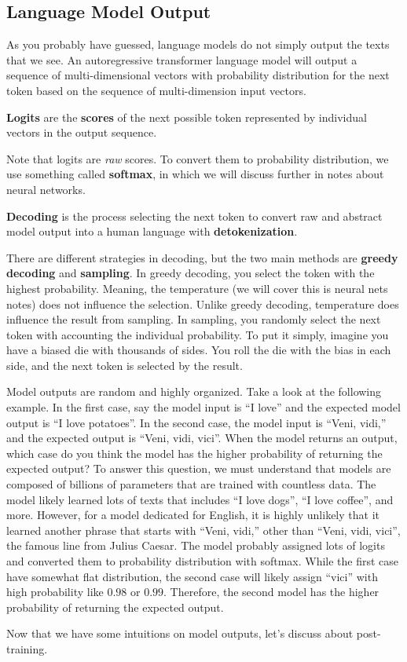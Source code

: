 \documentclass[../../main.tex]{subfiles}
\begin{document}
\subsection{Language Model Output}

As you probably have guessed, language models do not simply
output the texts that we see. An autoregressive transformer
language model will output a sequence of multi-dimensional
vectors with probability distribution for the next token based
on the sequence of multi-dimension input vectors.

\begin{definition}{}{}
\textbf{Logits} are the \textbf{scores} of the next possible
token represented by individual vectors in the output sequence.
\end{definition}

Note that logits are \textit{raw} scores. To convert them to
probability distribution, we use something called
\textbf{softmax}, in which we will discuss further in notes
about neural networks.

\begin{definition}{}{}
\textbf{Decoding} is the process selecting the next token to
convert raw and abstract model output into a human language
with \textbf{detokenization}.
\end{definition}

There are different strategies in decoding, but the two main
methods are \textbf{greedy decoding} and \textbf{sampling}.
In greedy decoding, you select the token with the highest
probability. Meaning, the temperature (we will cover this
is neural nets notes) does not influence the selection.
Unlike greedy decoding, temperature does influence the result
from sampling. In sampling, you randomly select the next token
with accounting the individual probability. To put it simply,
imagine you have a biased die with thousands of sides. You
roll the die with the bias in each side, and the next token
is selected by the result.

Model outputs are random and highly organized. Take a look
at the following example. In the first case, say the model
input is ``I love'' and the expected model output is ``I
love potatoes''. In the second case, the model input is
``Veni, vidi,'' and the expected output is ``Veni, vidi,
vici''. When the model returns an output, which case do you
think the model has the higher probability of returning the
expected output? To answer this question, we must understand
that models are composed of billions of parameters that are
trained with countless data. The model likely learned lots
of texts that includes ``I love dogs'', ``I love coffee'',
and more. However, for a model dedicated for English,
it is highly unlikely that it learned another phrase that
starts with ``Veni, vidi,'' other than ``Veni, vidi, vici'',
the famous line from Julius Caesar. The model probably
assigned lots of logits and converted them to probability
distribution with softmax. While the first case have somewhat
flat distribution, the second case will likely assign ``vici''
with high probability like $0.98$ or $0.99$. Therefore, the
second model has the higher probability of returning the
expected output. 

Now that we have some intuitions on model outputs, let's
discuss about post-training.
\end{document}
